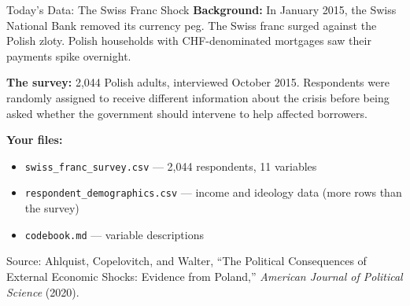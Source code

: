 \documentclass[aspectratio=169, 11pt]{beamer}
\begin{document}
\begin{frame}{Today's Data: The Swiss Franc Shock}
  \textbf{Background:} In January 2015, the Swiss National Bank removed its currency peg.
  The Swiss franc surged against the Polish zloty. Polish households with CHF-denominated
  mortgages saw their payments spike overnight.

  \vspace{0.5em}
  \textbf{The survey:} 2,044 Polish adults, interviewed October 2015. Respondents were
  randomly assigned to receive different information about the crisis before being asked
  whether the government should intervene to help affected borrowers.

  \vspace{0.5em}
  \textbf{Your files:}
  \begin{itemize}
    \item \texttt{swiss\_franc\_survey.csv} --- 2,044 respondents, 11 variables
    \item \texttt{respondent\_demographics.csv} --- income and ideology data (more rows than the survey)
    \item \texttt{codebook.md} --- variable descriptions
  \end{itemize}

  \vspace{0.3em}
  {\scriptsize Source: Ahlquist, Copelovitch, and Walter, ``The Political Consequences of External Economic Shocks: Evidence from Poland,'' \textit{American Journal of Political Science} (2020).}
\end{frame}
\end{document}
